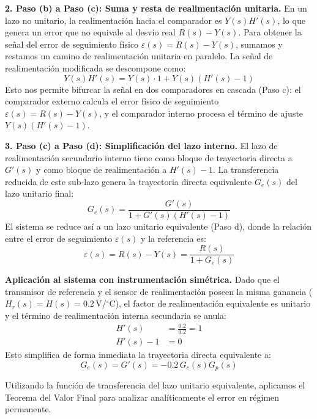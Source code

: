 \documentclass[journal,twocolumn]{IEEEtran}
\begin{document}
\textbf{2. Paso (b) a Paso (c): Suma y resta de realimentación unitaria.}
En un lazo no unitario, la realimentación hacia el comparador es $Y(s)H'(s)$, lo que genera un error que no equivale al desvío real $R(s) - Y(s)$. Para obtener la señal del error de seguimiento físico $\varepsilon(s) = R(s) - Y(s)$, sumamos y restamos un camino de realimentación unitaria en paralelo. La señal de realimentación modificada se descompone como:
\begin{equation}
    Y(s)H'(s) = Y(s) \cdot 1 + Y(s)(H'(s) - 1)
\end{equation}
Esto nos permite bifurcar la señal en dos comparadores en cascada (Paso c): el comparador externo calcula el error físico de seguimiento $\varepsilon(s) = R(s) - Y(s)$, y el comparador interno procesa el término de ajuste $Y(s)(H'(s)-1)$.

\textbf{3. Paso (c) a Paso (d): Simplificación del lazo interno.}
El lazo de realimentación secundario interno tiene como bloque de trayectoria directa a $G'(s)$ y como bloque de realimentación a $H'(s)-1$. La transferencia reducida de este sub-lazo genera la trayectoria directa equivalente $G_e(s)$ del lazo unitario final:
\begin{equation}
    G_e(s) = \frac{G'(s)}{1 + G'(s)(H'(s) - 1)}
\end{equation}
El sistema se reduce así a un lazo unitario equivalente (Paso d), donde la relación entre el error de seguimiento $\varepsilon(s)$ y la referencia es:
\begin{equation}
    \varepsilon(s) = R(s) - Y(s) = \frac{R(s)}{1 + G_e(s)}
\end{equation}

\textbf{Aplicación al sistema con instrumentación simétrica.}
Dado que el transmisor de referencia y el sensor de realimentación poseen la misma ganancia ($H_r(s) = H(s) = 0.2$\,V/$^\circ$C), el factor de realimentación equivalente es unitario y el término de realimentación interna secundaria se anula:
\begin{align}
    H'(s) &= \frac{0.2}{0.2} = 1 \\
    H'(s) - 1 &= 0
\end{align}
Esto simplifica de forma inmediata la trayectoria directa equivalente a:
\begin{equation}
    G_e(s) = G'(s) = -0.2\,G_c(s)G_p(s)
\end{equation}

Utilizando la función de transferencia del lazo unitario equivalente, aplicamos el Teorema del Valor Final para analizar analíticamente el error en régimen permanente.
\end{document}
